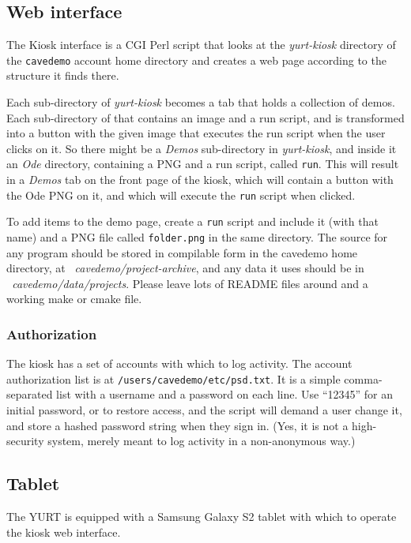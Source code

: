 \documentclass[11pt]{article}
\newcommand{\cmd}[1]{\texttt{#1}\xspace}
\newcommand{\dir}[1]{\textit{#1}\xspace}
\begin{document}
\subsection{Web interface}

The Kiosk interface is a CGI Perl script that looks at the
\dir{yurt-kiosk} directory of the \cmd{cavedemo} account home
directory and creates a web page according to the structure it finds
there.

Each sub-directory of \dir{yurt-kiosk} becomes a tab that holds a
collection of demos.  Each sub-directory of that contains an image and
a run script, and is transformed into a button with the given image
that executes the run script when the user clicks on it.  So there
might be a \dir{Demos} sub-directory in \dir{yurt-kiosk}, and inside
it an \dir{Ode} directory, containing a PNG and a run script, called
\cmd{run}.  This will result in a \dir{Demos} tab on the front page of
the kiosk, which will contain a button with the Ode PNG on it, and
which will execute the \cmd{run} script when clicked.


To add items to the demo page, create a \cmd{run} script and include
it (with that name) and a PNG file called \cmd{folder.png} in the same
directory.  The source for any program should be stored in compilable
form in the cavedemo home directory, at
\dir{~cavedemo/project-archive}, and any data it uses should be in
\dir{~cavedemo/data/projects}.  Please leave lots of README files
around and a working make or cmake file.

\subsubsection{Authorization}

The kiosk has a set of accounts with which to log activity.  The
account authorization list is at \cmd{/users/cavedemo/etc/psd.txt}.
It is a simple comma-separated list with a username and a password on
each line.  Use ``12345'' for an initial password, or to restore
access, and the script will demand a user change it, and store a
hashed password string when they sign in.  (Yes, it is not a
high-security system, merely meant to log activity in a non-anonymous
way.)


\subsection{Tablet}

The YURT is equipped with a Samsung Galaxy S2 tablet with which to
operate the kiosk web interface.
\end{document}
